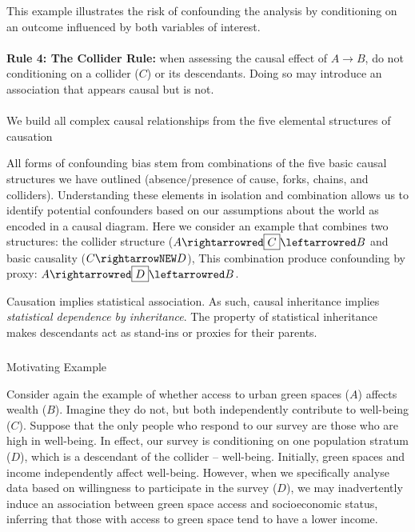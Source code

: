 \documentclass[
  singlecolumn]{article}
\makeatletter
\let\oldparagraph\paragraph
\renewcommand{\paragraph}{
    \@ifstar
      \xxxParagraphStar
      \xxxParagraphNoStar
  }
\newcommand{\xxxParagraphStar}[1]{\oldparagraph*{#1}\mbox{}}
\newcommand{\xxxParagraphNoStar}[1]{\oldparagraph{#1}\mbox{}}
\let\oldsubparagraph\subparagraph
\renewcommand{\subparagraph}{
    \@ifstar
      \xxxSubParagraphStar
      \xxxSubParagraphNoStar
  }
\newcommand{\xxxSubParagraphStar}[1]{\oldsubparagraph*{#1}\mbox{}}
\newcommand{\xxxSubParagraphNoStar}[1]{\oldsubparagraph{#1}\mbox{}}
\makeatother
\begin{document}
This example illustrates the risk of confounding the analysis by
conditioning on an outcome influenced by both variables of interest.

\paragraph{\texorpdfstring{\textbf{Rule 4: The Collider Rule:} when
assessing the causal effect of \(A\to B\), do not conditioning on a
collider (\(C\)) or its descendants. Doing so may introduce an
association that appears causal but is
not.}{Rule 4: The Collider Rule: when assessing the causal effect of A\textbackslash to B, do not conditioning on a collider (C) or its descendants. Doing so may introduce an association that appears causal but is not.}}\label{rule-4-the-collider-rule-when-assessing-the-causal-effect-of-ato-b-do-not-conditioning-on-a-collider-c-or-its-descendants.-doing-so-may-introduce-an-association-that-appears-causal-but-is-not.}

\paragraph{We build all complex causal relationships from the five
elemental structures of
causation}\label{we-build-all-complex-causal-relationships-from-the-five-elemental-structures-of-causation}

All forms of confounding bias stem from combinations of the five basic
causal structures we have outlined (absence/presence of cause, forks,
chains, and colliders). Understanding these elements in isolation and
combination allows us to identify potential confounders based on our
assumptions about the world as encoded in a causal diagram. Here we
consider an example that combines two structures: the collider structure
(\(A \rightarrowred \boxed{C} \leftarrowred
B\) and basic causality (\(C\rightarrowNEW D\)), This combination
produce confounding by proxy:
\(A \rightarrowred \boxed{D} \leftarrowred B\).

Causation implies statistical association. As such, causal inheritance
implies \emph{statistical dependence by inheritance}. The property of
statistical inheritance makes descendants act as stand-ins or proxies
for their parents.

\subparagraph{Motivating Example}\label{motivating-example-4}

Consider again the example of whether access to urban green spaces
(\(A\)) affects wealth (\(B\)). Imagine they do not, but both
independently contribute to well-being (\(C\)). Suppose that the only
people who respond to our survey are those who are high in well-being.
In effect, our survey is conditioning on one population stratum (\(D\)),
which is a descendant of the collider -- well-being. Initially, green
spaces and income independently affect well-being. However, when we
specifically analyse data based on willingness to participate in the
survey (\(\boxed{D}\)), we may inadvertently induce an association
between green space access and socioeconomic status, inferring that
those with access to green space tend to have a lower income.
\end{document}
